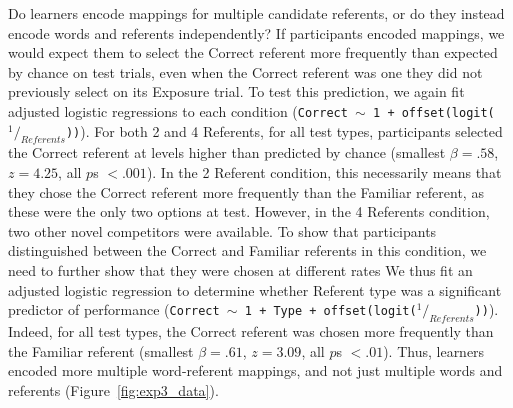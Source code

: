 \documentclass[authoryear,review]{elsarticle}
\begin{document}
Do learners encode mappings for multiple candidate referents, or do they instead encode words and referents independently? If participants encoded mappings, we would expect them to select the Correct referent more frequently than expected by chance on test trials, even when the Correct referent was one they did not previously select on its Exposure trial. To test this prediction, we again fit adjusted logistic regressions to each condition ({\small{\tt{Correct $\sim$ 1 + offset(logit($^1/_{Referents}$))}}}). For both 2 and 4 Referents, for all test types, participants selected the Correct referent at levels higher than predicted by chance (smallest $\beta =  .58$, $z=4.25$, all $p$s $< .001$). In the 2 Referent condition, this necessarily means that they chose the Correct referent more frequently than the Familiar referent, as these were the only two options at test. However, in the 4 Referents condition, two other novel competitors were available. To show that participants distinguished between the Correct and Familiar referents in this condition, we need to further show that they were chosen at different rates We thus fit an adjusted logistic regression to determine whether Referent type was a significant predictor of performance ({\small{\tt{Correct $\sim$ 1 + Type + offset(logit($^1/_{Referents}$))}}}). Indeed, for all test types, the Correct referent was chosen more frequently than the Familiar referent (smallest $\beta =  .61$, $z=3.09$, all $p$s $< .01$). Thus, learners encoded more multiple word-referent mappings, and not just multiple words and referents (Figure~\ref{fig:exp3_data}).
\end{document}
